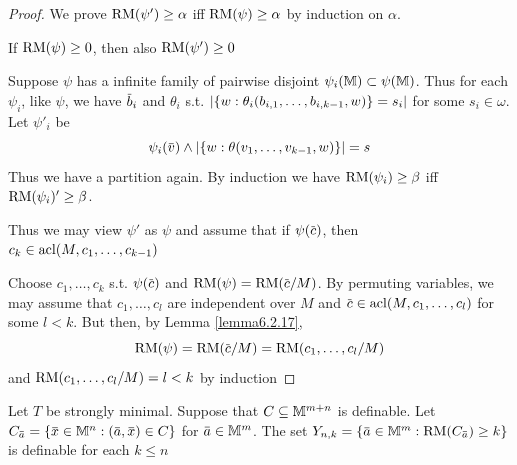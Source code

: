 \documentclass[11pt]{article}
\begin{document}
\begin{proof}
{We prove \(\operatorname{RM}(\psi')\ge\alpha\) iff \(\operatorname{RM}(\psi)\ge\alpha\) by induction on \(\alpha\).

If \(\operatorname{RM}(\psi)\ge 0\), then also \(\operatorname{RM}(\psi')\ge 0\)

Suppose \(\psi\) has a infinite family of pairwise disjoint \(\psi_i(\mathbb{M})\subset\psi(\mathbb{M})\). Thus for each \(\psi_i\),
like \(\psi\), we have \(\barb_i\) and \(\theta_i\) s.t. \(\abs{\{w:\theta_i(b_{i,1},\dots,b_{i,k-1},w)\}=s_i}\) for
some \(s_i\in\omega\). Let \(\psi'_i\) be
\begin{equation*}
\psi_i(\barv)\wedge\abs{\{w:\theta(v_1,\dots,v_{k-1},w)\}}=s
\end{equation*}
Thus we have a partition again. By induction we have \(\operatorname{RM}(\psi_i)\ge\beta\) iff \(\operatorname{RM}(\psi_i)'\ge\beta\).
}
Thus we may view \(\psi'\) as \(\psi\) and assume that if \(\psi(\barc)\), then \(c_k\in\operatorname{acl}(M,c_1,\dots,c_{k-1})\)

Choose \(c_1,\dots,c_k\) s.t. \(\psi(\barc)\) and \(\RM(\psi)=\RM(\barc/M)\).
By permuting variables, we may assume that \(c_1,\dots,c_l\) are independent over \(M\)
and \(\barc\in\acl(M,c_1,\dots,c_l)\) for some \(l< k\). But then, by Lemma \ref{lemma6.2.17},
\begin{equation*}
\RM(\psi)=\RM(\barc/M)=\RM(c_1,\dots,c_l/M)
\end{equation*}
and \(\operatorname{RM}(c_1,\dots,c_l/M)=l<k\) by induction
\end{proof}

\begin{lemma}[]
Let \(T\) be strongly minimal. Suppose that \(C\subseteq\mathbb{M}^{m+n}\) is definable.
Let \(C_{\bara}=\{\barx\in\M^n:(\bara,\barx)\in C\}\) for \(\bara\in\M^m\). The
set \(Y_{n,k}=\{\bara\in\M^m:\RM(C_{\bara})\ge k\}\) is definable for each \(k\le n\)
\end{lemma}
\end{document}
